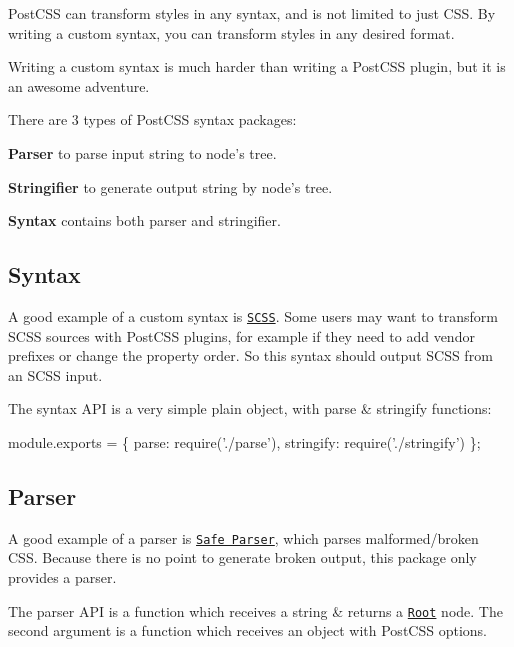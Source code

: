 Post\+C\+SS can transform styles in any syntax, and is not limited to just C\+SS. By writing a custom syntax, you can transform styles in any desired format.

Writing a custom syntax is much harder than writing a Post\+C\+SS plugin, but it is an awesome adventure.

There are 3 types of Post\+C\+SS syntax packages\+:


\begin{DoxyItemize}
\item {\bfseries Parser} to parse input string to node’s tree.
\item {\bfseries Stringifier} to generate output string by node’s tree.
\item {\bfseries Syntax} contains both parser and stringifier.
\end{DoxyItemize}

\subsection*{Syntax}

A good example of a custom syntax is \href{https://github.com/postcss/postcss-scss}{\tt S\+C\+SS}. Some users may want to transform S\+C\+SS sources with Post\+C\+SS plugins, for example if they need to add vendor prefixes or change the property order. So this syntax should output S\+C\+SS from an S\+C\+SS input.

The syntax A\+PI is a very simple plain object, with {\ttfamily parse} \& {\ttfamily stringify} functions\+:


\begin{DoxyCode}
module.exports = \{
    parse:     require('./parse'),
    stringify: require('./stringify')
\};
\end{DoxyCode}


\subsection*{Parser}

A good example of a parser is \href{https://github.com/postcss/postcss-safe-parser}{\tt Safe Parser}, which parses malformed/broken C\+SS. Because there is no point to generate broken output, this package only provides a parser.

The parser A\+PI is a function which receives a string \& returns a \href{http://api.postcss.org/Root.html}{\tt {\ttfamily Root}} node. The second argument is a function which receives an object with Post\+C\+SS options.


